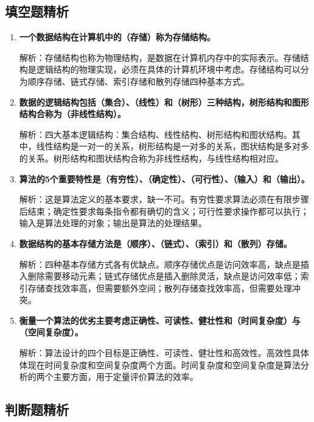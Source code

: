 \documentclass[12pt, a4paper]{article}
\begin{document}
\subsection{填空题精析}

\begin{enumerate}
	\item \textbf{一个数据结构在计算机中的（存储）称为存储结构。}

	      解析：存储结构也称为物理结构，是数据在计算机内存中的实际表示。存储结构是逻辑结构的物理实现，必须在具体的计算机环境中考虑。存储结构可以分为顺序存储、链式存储、索引存储和散列存储四种基本方式。

	\item \textbf{数据的逻辑结构包括（集合）、（线性）和（树形）三种结构，树形结构和图形结构合称为（非线性结构）。}

	      解析：四大基本逻辑结构：集合结构、线性结构、树形结构和图状结构。其中，线性结构是一对一的关系，树形结构是一对多的关系，图状结构是多对多的关系。树形结构和图状结构合称为非线性结构，与线性结构相对应。

	\item \textbf{算法的5个重要特性是（有穷性）、（确定性）、（可行性）、（输入）和（输出）。}

	      解析：这是算法定义的基本要求，缺一不可。有穷性要求算法必须在有限步骤后结束；确定性要求每条指令都有确切的含义；可行性要求操作都可以执行；输入是算法处理的对象；输出是算法的处理结果。

	\item \textbf{数据结构的基本存储方法是（顺序）、（链式）、（索引）和（散列）存储。}

	      解析：四种基本存储方式各有优缺点。顺序存储优点是访问效率高，缺点是插入删除需要移动元素；链式存储优点是插入删除灵活，缺点是访问效率低；索引存储查找效率高，但需要额外空间；散列存储查找效率高，但需要处理冲突。

	\item \textbf{衡量一个算法的优劣主要考虑正确性、可读性、健壮性和（时间复杂度）与（空间复杂度）。}

	      解析：算法设计的四个目标是正确性、可读性、健壮性和高效性。高效性具体体现在时间复杂度和空间复杂度两个方面。时间复杂度和空间复杂度是算法分析的两个主要方面，用于定量评价算法的效率。
\end{enumerate}

\subsection{判断题精析}
\end{document}

